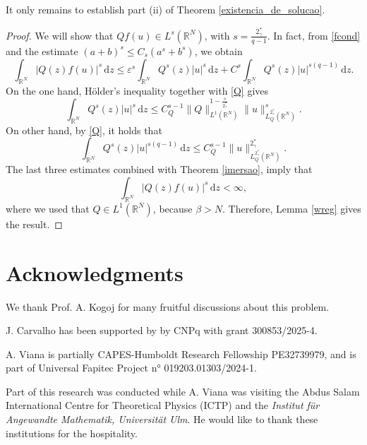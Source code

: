 \documentclass[12pt]{amsart}
\newcommand{\R}{\mathbb{R}}
\begin{document}
It only remains to establish part (ii) of Theorem \ref{existencia_de_solucao}.

\begin{proof} 
We will show that \(Q f(u) \in L^s(\mathbb{R}^N)\), with $s=\frac{2^*_\gamma}{q-1}$. In fact, from \eqref{fcond} and the estimate $(a+b)^s\leq C_s(a^s + b^s)$, we obtain
\[
\int_{\R^N} \left|Q(z) f(u)\right|^s \, \mathrm{d} z \leq \varepsilon^s \int_{\R^N} Q^s(z)|u|^s\, \mathrm{d} z + C^s\int_{\R^N} Q^s(z)|u|^{s(q-1)} \, \mathrm{d} z.
\]
On the one hand, Hölder's  inequality together with \ref{Q} gives
\[
\int_{\R^N} Q^s(z)|u|^s\, \mathrm{d} z \leq C_Q^{s-1}\|Q\|_{L^1(\R^N)}^{1-\frac{s}{2^*_\gamma}} \|u\|_{L_Q^{2^*_\gamma}(\R^N)}^s.
\]
On other hand, by \ref{Q}, it holds that
\[
\int_{\R^N} Q^s(z)|u|^{s(q-1)} \, \mathrm{d} z \leq C_Q^{s-1}\|u\|_{L_Q^{2^*_\gamma}(\R^N)}^{2_\gamma^*}.
\]
The last three estimates combined with Theorem \ref{imersao}, imply that 
\[
\int_{\R^N} \left|Q(z) f(u)\right|^s \, \mathrm{d} z<\infty,
\]
where we used that \(Q \in L^1(\mathbb{R}^N)\), because \(\beta>N\). Therefore, Lemma \ref{wreg} gives the result.
\end{proof}

\section*{Acknowledgments} 

We thank Prof. A. Kogoj for many fruitful discussions about this problem.

J. Carvalho has been supported by by CNPq with grant 300853/2025-4.

A. Viana is partially CAPES-Humboldt Research Fellowship PE32739979, and is part of Universal Fapitec Project n° 019203.01303/2024-1.

Part of this research was conducted while A. Viana was visiting the Abdus Salam International Centre for Theoretical Physics (ICTP) and the \textit{Institut f\"ur Angewandte Mathematik, Universit\"at Ulm}. He would like to thank these institutions for the hospitality.  
 
\end{document}
